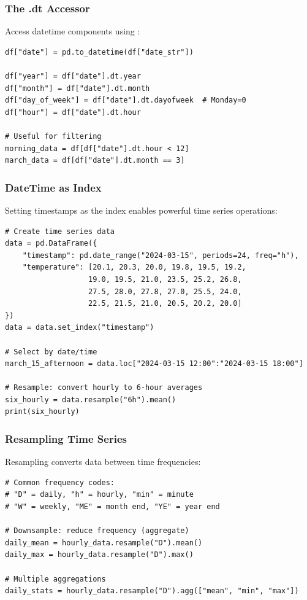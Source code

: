 \subsubsection{The .dt Accessor}

Access datetime components using :

\begin{lstlisting}
df["date"] = pd.to_datetime(df["date_str"])

df["year"] = df["date"].dt.year
df["month"] = df["date"].dt.month
df["day_of_week"] = df["date"].dt.dayofweek  # Monday=0
df["hour"] = df["date"].dt.hour

# Useful for filtering
morning_data = df[df["date"].dt.hour < 12]
march_data = df[df["date"].dt.month == 3]
\end{lstlisting}

\subsubsection{DateTime as Index}

Setting timestamps as the index enables powerful time series operations:

\begin{lstlisting}
# Create time series data
data = pd.DataFrame({
    "timestamp": pd.date_range("2024-03-15", periods=24, freq="h"),
    "temperature": [20.1, 20.3, 20.0, 19.8, 19.5, 19.2,
                   19.0, 19.5, 21.0, 23.5, 25.2, 26.8,
                   27.5, 28.0, 27.8, 27.0, 25.5, 24.0,
                   22.5, 21.5, 21.0, 20.5, 20.2, 20.0]
})
data = data.set_index("timestamp")

# Select by date/time
march_15_afternoon = data.loc["2024-03-15 12:00":"2024-03-15 18:00"]

# Resample: convert hourly to 6-hour averages
six_hourly = data.resample("6h").mean()
print(six_hourly)
\end{lstlisting}

\subsubsection{Resampling Time Series}

Resampling converts data between time frequencies:

\begin{lstlisting}
# Common frequency codes:
# "D" = daily, "h" = hourly, "min" = minute
# "W" = weekly, "ME" = month end, "YE" = year end

# Downsample: reduce frequency (aggregate)
daily_mean = hourly_data.resample("D").mean()
daily_max = hourly_data.resample("D").max()

# Multiple aggregations
daily_stats = hourly_data.resample("D").agg(["mean", "min", "max"])
\end{lstlisting}

